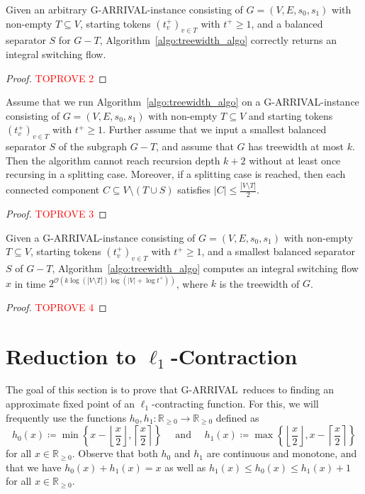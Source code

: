\documentclass[a4paper,UKenglish,cleveref, autoref, thm-restate]{lipics-v2021}
\newcommand{\R}{\mathbb{R}}
\newcommand{\bigO}{\mathcal{O}}
\newcommand{\problem}[1]{\textrm{#1}}
\newcommand{\garrival}{\problem{G-ARRIVAL}}
\begin{document}
\begin{lemma}
\label{lemma:correctness_algo_2}
    Given an arbitrary \garrival-instance consisting of $G = (V, E, s_0, s_1)$ with non-empty $T \subseteq V$, starting tokens $(t^+_v)_{v \in T}$ with $t^+ \geq 1$, and a balanced separator $S$ for $G - T$, Algorithm~\ref{algo:treewidth_algo} correctly returns an integral switching flow.
\end{lemma}
\begin{proof}\textcolor{red}{TOPROVE 2}\end{proof}

\begin{lemma}
\label{lemma:splitting_soon}
    Assume that we run Algorithm~\ref{algo:treewidth_algo} on a \garrival-instance consisting of $G = (V, E, s_0, s_1)$ with non-empty $T \subseteq V$ and starting tokens $(t^+_v)_{v \in T}$ with $t^+ \geq 1$. Further assume that we input a smallest balanced separator $S$ of the subgraph $G - T$, and assume that $G$ has treewidth at most $k$. 
    Then the algorithm cannot reach recursion depth $k + 2$ without at least once recursing in a splitting case. Moreover, if a splitting case is reached, then each connected component $C \subseteq V \setminus (T \cup S)$ satisfies $|C| \leq \frac{|V \setminus T|}{2}$.
\end{lemma}
\begin{proof}\textcolor{red}{TOPROVE 3}\end{proof}

\begin{theorem}
    Given a \garrival-instance consisting of $G = (V, E, s_0, s_1)$ with non-empty $T \subseteq V$, starting tokens $(t^+_v)_{v \in T}$ with $t^+ \geq 1$, and a smallest balanced separator $S$ of $G - T$, Algorithm~\ref{algo:treewidth_algo} computes an integral switching flow $x$ in time $2^{\bigO \left(k \log (|V \setminus T|) \log (|V | + \log t^+) \right)}$, where $k$ is the treewidth of $G$.
\end{theorem}
\begin{proof}\textcolor{red}{TOPROVE 4}\end{proof}

\section{Reduction to \texorpdfstring{$\ell_1$}{l1}-Contraction}
\label{sec:solving_arrival_via_contraction}

The goal of this section is to prove that \garrival\ reduces to finding an approximate fixed point of an $\ell_1$-contracting function. For this, we will frequently use the functions $h_0, h_1 : \R_{\geq 0} \rightarrow \R_{\geq 0}$ defined as 
\[
    h_0(x) \coloneqq \min \left\{ x - \left\lfloor \frac{x}{2} \right\rfloor, \left\lceil \frac{x}{2} \right\rceil  \right\}  \quad \text{ and } \quad h_1(x) \coloneqq \max \left\{ \left\lfloor \frac{x}{2} \right\rfloor, x - \left\lceil \frac{x}{2} \right\rceil \right\}
\]
for all $x \in \R_{\geq 0}$. Observe that both $h_0$ and $h_1$ are continuous and monotone, and that we have $h_0(x) + h_1(x) = x$ as well as $h_1(x) \leq h_0(x) \leq h_1(x) + 1$ for all $x \in \R_{\geq 0}$.
\end{document}
